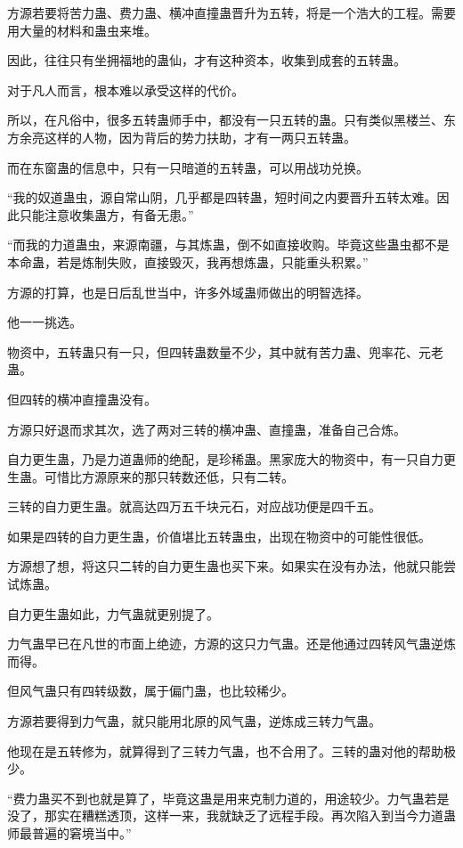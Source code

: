 
\begin{this_body}

方源若要将苦力蛊、费力蛊、横冲直撞蛊晋升为五转，将是一个浩大的工程。需要用大量的材料和蛊虫来堆。

因此，往往只有坐拥福地的蛊仙，才有这种资本，收集到成套的五转蛊。

对于凡人而言，根本难以承受这样的代价。

所以，在凡俗中，很多五转蛊师手中，都没有一只五转的蛊。只有类似黑楼兰、东方余亮这样的人物，因为背后的势力扶助，才有一两只五转蛊。

而在东窗蛊的信息中，只有一只暗道的五转蛊，可以用战功兑换。

“我的奴道蛊虫，源自常山阴，几乎都是四转蛊，短时间之内要晋升五转太难。因此只能注意收集蛊方，有备无患。”

“而我的力道蛊虫，来源南疆，与其炼蛊，倒不如直接收购。毕竟这些蛊虫都不是本命蛊，若是炼制失败，直接毁灭，我再想炼蛊，只能重头积累。”

方源的打算，也是日后乱世当中，许多外域蛊师做出的明智选择。

他一一挑选。

物资中，五转蛊只有一只，但四转蛊数量不少，其中就有苦力蛊、兜率花、元老蛊。

但四转的横冲直撞蛊没有。

方源只好退而求其次，选了两对三转的横冲蛊、直撞蛊，准备自己合炼。

自力更生蛊，乃是力道蛊师的绝配，是珍稀蛊。黑家庞大的物资中，有一只自力更生蛊。可惜比方源原来的那只转数还低，只有二转。

三转的自力更生蛊。就高达四万五千块元石，对应战功便是四千五。

如果是四转的自力更生蛊，价值堪比五转蛊虫，出现在物资中的可能性很低。

方源想了想，将这只二转的自力更生蛊也买下来。如果实在没有办法，他就只能尝试炼蛊。

自力更生蛊如此，力气蛊就更别提了。

力气蛊早已在凡世的市面上绝迹，方源的这只力气蛊。还是他通过四转风气蛊逆炼而得。

但风气蛊只有四转级数，属于偏门蛊，也比较稀少。

方源若要得到力气蛊，就只能用北原的风气蛊，逆炼成三转力气蛊。

他现在是五转修为，就算得到了三转力气蛊，也不合用了。三转的蛊对他的帮助极少。

“费力蛊买不到也就是算了，毕竟这蛊是用来克制力道的，用途较少。力气蛊若是没了，那实在糟糕透顶，这样一来，我就缺乏了远程手段。再次陷入到当今力道蛊师最普遍的窘境当中。”


\end{this_body}
